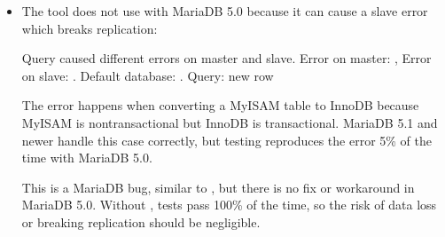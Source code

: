\documentclass[letterpaper,10pt,english]{sphinxmanual}
\begin{document}
\begin{fulllineitems}
\begin{itemize}
\begin{sphinxVerbatim}[commandchars=\\\{\}]
CONSTRAINT fk\PYGZus{}foo FOREIGN KEY foo\PYGZus{}id REFERENCES bar foo\PYGZus{}id
\end{sphinxVerbatim}

\sphinxAtStartPar
You must specify .

\item {} 
\sphinxAtStartPar
The tool does not use  with MariaDB 5.0 because it can
cause a slave error which breaks replication:

\begin{sphinxVerbatim}[commandchars=\\\{\}]
Query caused different errors on master and slave. Error on master:
 ,
Error on slave:  . Default database: .
Query: new row
\end{sphinxVerbatim}

\sphinxAtStartPar
The error happens when converting a MyISAM table to InnoDB because MyISAM
is non\sphinxhyphen{}transactional but InnoDB is transactional.  MariaDB 5.1 and newer
handle this case correctly, but testing reproduces the error 5\% of the time
with MariaDB 5.0.

\sphinxAtStartPar
This is a MariaDB bug, similar to ,
but there is no fix or workaround in MariaDB 5.0.  Without ,
tests pass 100\% of the time, so the risk of data loss or breaking replication
should be negligible.

\sphinxAtStartPar
{}

\end{itemize}

\end{fulllineitems}
\end{document}
